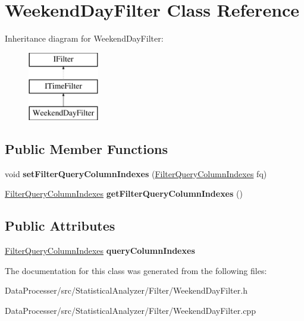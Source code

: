 \hypertarget{classWeekendDayFilter}{}\section{Weekend\+Day\+Filter Class Reference}
\label{classWeekendDayFilter}
Inheritance diagram for Weekend\+Day\+Filter\+:\begin{figure}[H]
\begin{center}
\leavevmode
\includegraphics[height=3.000000cm]{classWeekendDayFilter}
\end{center}
\end{figure}
\subsection*{Public Member Functions}
\begin{DoxyCompactItemize}
\item 
\mbox{\label{classWeekendDayFilter_a0f6ff3511a2c7bb47e6c22b85810eb4a}} 
void {\bfseries set\+Filter\+Query\+Column\+Indexes} (\hyperlink{structFilterQueryColumnIndexes}{Filter\+Query\+Column\+Indexes} fq)
\item 
\mbox{\label{classWeekendDayFilter_a86bed8fc0fdb6d5401a9ff45fe2b0794}} 
\hyperlink{structFilterQueryColumnIndexes}{Filter\+Query\+Column\+Indexes} {\bfseries get\+Filter\+Query\+Column\+Indexes} ()
\end{DoxyCompactItemize}
\subsection*{Public Attributes}
\begin{DoxyCompactItemize}
\item 
\mbox{\label{classWeekendDayFilter_ab632a7f6141066d8b9244850ccb03cf2}} 
\hyperlink{structFilterQueryColumnIndexes}{Filter\+Query\+Column\+Indexes} {\bfseries query\+Column\+Indexes}
\end{DoxyCompactItemize}


The documentation for this class was generated from the following files\+:\begin{DoxyCompactItemize}
\item 
Data\+Processer/src/\+Statistical\+Analyzer/\+Filter/Weekend\+Day\+Filter.\+h\item 
Data\+Processer/src/\+Statistical\+Analyzer/\+Filter/Weekend\+Day\+Filter.\+cpp\end{DoxyCompactItemize}
